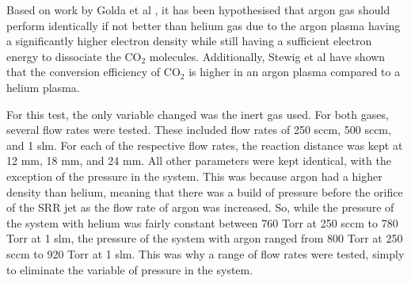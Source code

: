 Based on work by Golda et al \cite{}, it has been hypothesised that argon gas should perform identically if not better than helium gas due to the argon plasma having a significantly higher electron density while still having a sufficient electron energy to dissociate the CO$_2$ molecules. Additionally, Stewig et al \cite{} have shown that the conversion efficiency of CO$_2$ is higher in an argon plasma compared to a helium plasma.

For this test, the only variable changed was the inert gas used. For both gases, several flow rates were tested. These included flow rates of 250 sccm, 500 sccm, and 1 slm. For each of the respective flow rates, the reaction distance was kept at 12 mm, 18 mm, and 24 mm. All other parameters were kept identical, with the exception of the pressure in the system. This was because argon had a higher density than helium, meaning that there was a build of pressure before the orifice of the SRR jet as the flow rate of argon was increased. So, while the pressure of the system with helium was fairly constant between 760 Torr at 250 sccm to 780 Torr at 1 slm, the pressure of the system with argon ranged from 800 Torr at 250 sccm to 920 Torr at 1 slm. This was why a range of flow rates were tested, simply to eliminate the variable of pressure in the system.

